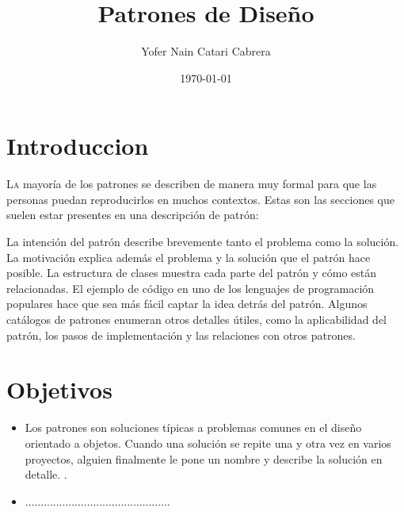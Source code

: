 \documentclass[twoside,twocolumn]{article}
\title{Patrones de Diseño} %
\author{Yofer Nain Catari Cabrera}
\date{\today} %
\begin{document}
\maketitle


\section{Introduccion}

\lettrine[nindent=0em,lines=3]{L}a mayoría de los patrones se describen de manera muy formal para que las personas puedan reproducirlos en muchos contextos. Estas son las secciones que suelen estar presentes en una descripción de patrón:

La intención del patrón describe brevemente tanto el problema como la solución.
La motivación explica además el problema y la solución que el patrón hace posible.
La estructura de clases muestra cada parte del patrón y cómo están relacionadas.
El ejemplo de código en uno de los lenguajes de programación populares hace que sea más fácil captar la idea detrás del patrón.
Algunos catálogos de patrones enumeran otros detalles útiles, como la aplicabilidad del patrón, los pasos de implementación y las relaciones con otros patrones.




\section{Objetivos}

\begin{itemize}
\item  Los patrones son soluciones típicas a problemas comunes en el diseño orientado a objetos. Cuando una solución se repite una y otra vez en varios proyectos, alguien finalmente le pone un nombre y describe la solución en detalle. .
\item ...............................................



\end{itemize}




\end{document}
